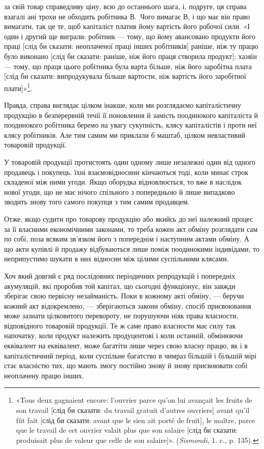\parcont{}  %
за свій товар справедливу ціну, всю до останнього шага, і, подруге,
ця справа взагалі ані трохи не обходить робітника В.~Чого вимагає
В, і що має він право вимагати, так це те, щоб капіталіст
платив йому вартість його робочої сили. «І один і другий ще
виграли: робітник — тому, що йому авансовано продукти його
праці [слід би сказати: неоплаченої праці інших робітників]
раніше, ніж ту працю було виконано [слід би сказати: раніше,
ніж його праця створила продукт]; хазяїн — тому, що праця
цього робітника була варта більше, ніж його заробітна плата
[слід би сказати: випродукувала більше вартости, ніж вартість
його заробітної плати]»\footnote*{
«Tous deux gagnaient encore: l'ouvrier parce qu’on lui avançait les
fruits de son travail [слід би сказати: du travail gratuit d’autres ouvriers]
avant qu’il fût fait [слід би сказати: avant que le sien ait porté de fruit],
le maître, parce que le travail de cet ouvrier valait plus que son salaire
[слід би сказати: produisait plus de valeur que celle de son salaire]».
(\emph{Sismondi}, 1. c., p. 135).
}.

Правда, справа виглядає цілком інакше, коли ми розглядаємо
капіталістичну продукцію в безперервній течії її поновлення
й замість поодинокого капіталіста й поодинокого робітника
беремо на увагу сукупність, клясу капіталістів і проти
неї клясу робітників. Але тим самим ми приклали б маштаб,
цілком невластивий товаровій продукції.

У товаровій продукції протистоять один одному лише незалежні
один від одного продавець і покупець. їхні взаємовідносини
кінчаються тоді, коли минає строк складеної між ними угоди.
Якщо оборудка відновлюється, то вже в наслідок нової угоди,
що не має нічого спільного з попередньою й лише випадково
зводить знову того самого покупця з тим самим продавцем.

Отже, якщо судити про товарову продукцію або якийсь до
неї належний процес за її власними економічними законами,
то треба кожен акт обміну розглядати сам по собі, поза всяким
зв’язком його з попереднім і наступним актами обміну. А що акти
купівлі й продажу відбуваються лише поміж поодинокими індивідами,
то неприпустимо шукати в них відносин між цілими
суспільними клясами.

Хоч який довгий є ряд послідовних періодичних репродукцій
і попередніх акумуляцій, які проробив той капітал, що сьогодні
функціонує, він завжди зберігає свою первісну незайманість.
Поки в кожному акті обміну, — беручи кожний акт відокремлено, —
зберігаються закони обміну, спосіб присвоювання може зазнати
цілковитого перевороту, не порушуючи ніяк права власности,
відповідного товаровій продукції. Те ж саме право власности
має силу так напочатку, коли продукт належить продуцентові
і коли останній, обмінюючи еквівалент на еквівалент, може багатіти
лише через свою власну працю, як і в капіталістичний період,
коли суспільне багатство в чимраз більшій і більшій мірі
стає власністю тих, що мають змогу постійно знову й знову присвоювати
собі неоплачену працю інших.
